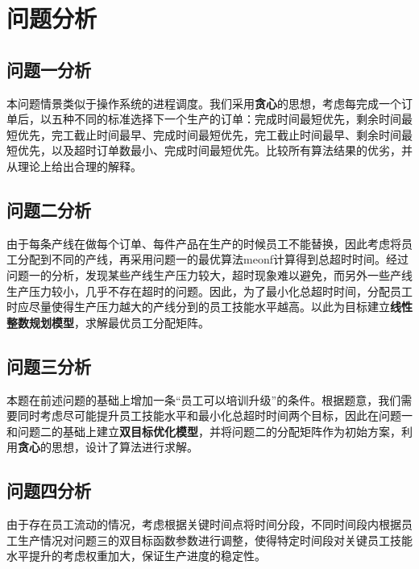\section{问题分析}

\subsection{问题一分析}
本问题情景类似于操作系统的进程调度。我们采用\textbf{贪心}的思想，考虑每完成一个订单后，以五种不同的标准选择下一个生产的订单：完成时间最短优先，剩余时间最短优先，完工截止时间最早、完成时间最短优先，完工截止时间最早、剩余时间最短优先，以及超时订单数最小、完成时间最短优先。比较所有算法结果的优劣，并从理论上给出合理的解释。

\subsection{问题二分析}
由于每条产线在做每个订单、每件产品在生产的时候员工不能替换，因此考虑将员工分配到不同的产线，再采用问题一的最优算法meonf计算得到总超时时间。经过问题一的分析，发现某些产线生产压力较大，超时现象难以避免，而另外一些产线生产压力较小，几乎不存在超时的问题。因此，为了最小化总超时时间，分配员工时应尽量使得生产压力越大的产线分到的员工技能水平越高。以此为目标建立\textbf{线性整数规划模型}，求解最优员工分配矩阵。


\subsection{问题三分析}
本题在前述问题的基础上增加一条“员工可以培训升级”的条件。根据题意，我们需要同时考虑尽可能提升员工技能水平和最小化总超时时间两个目标，因此在问题一和问题二的基础上建立\textbf{双目标优化模型}，并将问题二的分配矩阵作为初始方案，利用\textbf{贪心}的思想，设计了算法进行求解。

\subsection{问题四分析}
由于存在员工流动的情况，考虑根据关键时间点将时间分段，不同时间段内根据员工生产情况对问题三的双目标函数参数进行调整，使得特定时间段对关键员工技能水平提升的考虑权重加大，保证生产进度的稳定性。